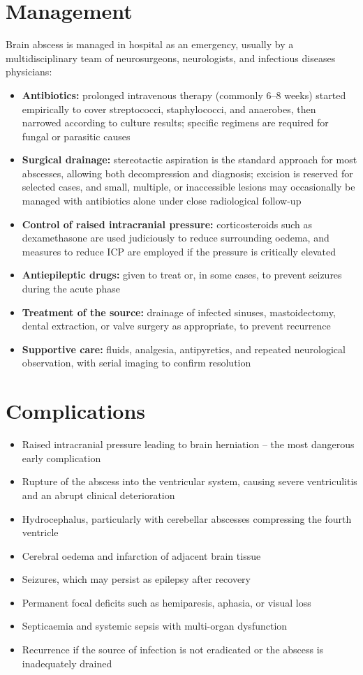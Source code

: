 \section*{Management}
Brain abscess is managed in hospital as an emergency, usually by a multidisciplinary team of neurosurgeons, neurologists, and infectious diseases physicians:

\begin{itemize}
    \item \textbf{Antibiotics:} prolonged intravenous therapy (commonly 6--8 weeks) started empirically to cover streptococci, staphylococci, and anaerobes, then narrowed according to culture results; specific regimens are required for fungal or parasitic causes
    \item \textbf{Surgical drainage:} stereotactic aspiration is the standard approach for most abscesses, allowing both decompression and diagnosis; excision is reserved for selected cases, and small, multiple, or inaccessible lesions may occasionally be managed with antibiotics alone under close radiological follow-up
    \item \textbf{Control of raised intracranial pressure:} corticosteroids such as dexamethasone are used judiciously to reduce surrounding oedema, and measures to reduce ICP are employed if the pressure is critically elevated
    \item \textbf{Antiepileptic drugs:} given to treat or, in some cases, to prevent seizures during the acute phase
    \item \textbf{Treatment of the source:} drainage of infected sinuses, mastoidectomy, dental extraction, or valve surgery as appropriate, to prevent recurrence
    \item \textbf{Supportive care:} fluids, analgesia, antipyretics, and repeated neurological observation, with serial imaging to confirm resolution
\end{itemize}

\section*{Complications}
\begin{itemize}
    \item Raised intracranial pressure leading to brain herniation -- the most dangerous early complication
    \item Rupture of the abscess into the ventricular system, causing severe ventriculitis and an abrupt clinical deterioration
    \item Hydrocephalus, particularly with cerebellar abscesses compressing the fourth ventricle
    \item Cerebral oedema and infarction of adjacent brain tissue
    \item Seizures, which may persist as epilepsy after recovery
    \item Permanent focal deficits such as hemiparesis, aphasia, or visual loss
    \item Septicaemia and systemic sepsis with multi-organ dysfunction
    \item Recurrence if the source of infection is not eradicated or the abscess is inadequately drained
\end{itemize}

